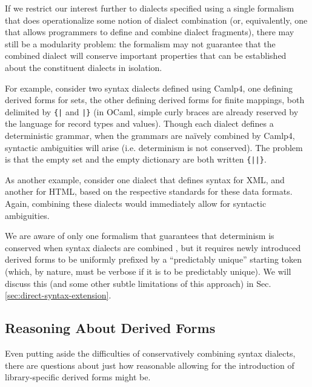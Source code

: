 If we restrict our interest further to dialects specified using a single formalism that does operationalize some notion of dialect combination (or, equivalently, one that allows programmers to define and combine dialect fragments), there may still be a modularity problem: the formalism may not guarantee that the combined dialect will conserve important properties that can be established about the constituent dialects in isolation. %

For example, consider two syntax dialects defined using Camlp4, one defining derived forms for sets, the other defining derived forms for finite mappings, both delimited by \verb~{|~ and \verb~|}~ (in OCaml, simple curly braces are already reserved by the language for record types and values). Though each dialect defines a deterministic grammar, when the grammars are na\"ively combined by Camlp4, syntactic ambiguities will arise (i.e. determinism is not conserved). The problem is that the empty set and the empty dictionary are both written \verb~{||}~. 

As another example, consider one dialect that defines syntax for XML, and another for HTML, based on the respective standards for these data formats. Again, combining these dialects would immediately allow for syntactic ambiguities.

We are aware of only one formalism that guarantees that determinism is conserved when syntax dialects are combined \cite{conf/pldi/SchwerdfegerW09}, but it requires newly introduced derived forms to be uniformly prefixed by a ``predictably unique'' starting token (which, by nature, must be verbose if it is to be predictably unique). We will discuss this (and some other subtle limitations of this approach) in Sec. \ref{sec:direct-syntax-extension}.

\subsection{Reasoning About Derived Forms}
Even putting aside the difficulties of conservatively combining syntax dialects, there are questions about just how reasonable allowing for the introduction of library-specific derived forms might be.

